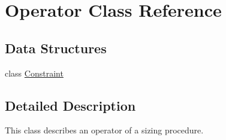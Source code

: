 \hypertarget{class_operator}{}\section{Operator Class Reference}
\label{class_operator}
\subsection*{Data Structures}
\begin{DoxyCompactItemize}
\item 
class \mbox{\hyperlink{class_operator_1_1_constraint}{Constraint}}
\end{DoxyCompactItemize}


\subsection{Detailed Description}
This class describes an operator of a sizing procedure. 